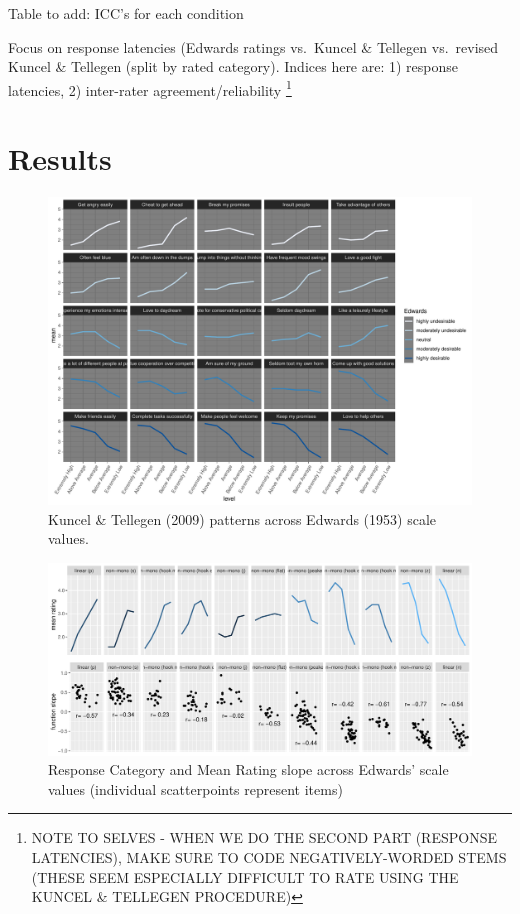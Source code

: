 \documentclass[
  ,jou]{apa6}
\begin{document}
Table to add: ICC's for each condition

Focus on response latencies (Edwards ratings vs.~Kuncel \& Tellegen vs.~revised Kuncel \& Tellegen (split by rated category). Indices here are: 1) response latencies, 2) inter-rater agreement/reliability \footnote{NOTE TO SELVES - WHEN WE DO THE SECOND PART (RESPONSE LATENCIES), MAKE SURE TO CODE NEGATIVELY-WORDED STEMS (THESE SEEM ESPECIALLY DIFFICULT TO RATE USING THE KUNCEL \& TELLEGEN PROCEDURE)}

\hypertarget{results-1}{%
\section{Results}\label{results-1}}

\begin{figure}
\centering
\includegraphics{KuncelTellegen_files/figure-latex/Figure2-1.pdf}
\caption{\label{fig:Figure2}Kuncel \& Tellegen (2009) patterns across Edwards (1953) scale values.}
\end{figure}

\begin{figure}
\centering
\includegraphics{KuncelTellegen_files/figure-latex/lastone-1.pdf}
\caption{\label{fig:lastone}Response Category and Mean Rating slope across Edwards' scale values (individual scatterpoints represent items)}
\end{figure}
\end{document}
